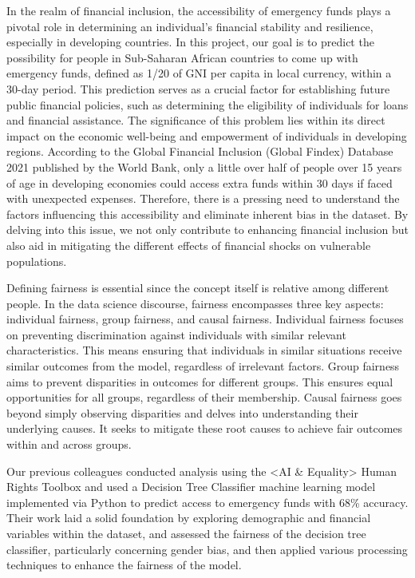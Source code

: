 \documentclass[12pt]{article}
\begin{document}
In the realm of financial inclusion, the accessibility of emergency
funds plays a pivotal role in determining an individual's financial
stability and resilience, especially in developing countries. In this
project, our goal is to predict the possibility for people in
Sub-Saharan African countries to come up with emergency funds, defined
as 1/20 of GNI per capita in local currency, within a 30-day period.
This prediction serves as a crucial factor for establishing future
public financial policies, such as determining the eligibility of
individuals for loans and financial assistance. The significance of this
problem lies within its direct impact on the economic well-being and
empowerment of individuals in developing regions. According to the
Global Financial Inclusion (Global Findex) Database 2021 published by
the World Bank, only a little over half of people over 15 years of age
in developing economies could access extra funds within 30 days if faced
with unexpected expenses. Therefore, there is a pressing need to
understand the factors influencing this accessibility and eliminate
inherent bias in the dataset. By delving into this issue, we not only
contribute to enhancing financial inclusion but also aid in mitigating
the different effects of financial shocks on vulnerable populations.

Defining fairness is essential since the concept itself is relative
among different people. In the data science discourse, fairness
encompasses three key aspects: individual fairness, group fairness, and
causal fairness. Individual fairness focuses on preventing
discrimination against individuals with similar relevant
characteristics. This means ensuring that individuals in similar
situations receive similar outcomes from the model, regardless of
irrelevant factors. Group fairness aims to prevent disparities in
outcomes for different groups. This ensures equal opportunities for all
groups, regardless of their membership. Causal fairness goes beyond
simply observing disparities and delves into understanding their
underlying causes. It seeks to mitigate these root causes to achieve
fair outcomes within and across groups.

Our previous colleagues conducted analysis using the \textless AI \&
Equality\textgreater{} Human Rights Toolbox and used a Decision Tree
Classifier machine learning model implemented via Python to predict
access to emergency funds with 68\% accuracy. Their work laid a solid
foundation by exploring demographic and financial variables within the
dataset, and assessed the fairness of the decision tree classifier,
particularly concerning gender bias, and then applied various processing
techniques to enhance the fairness of the model.
\end{document}
